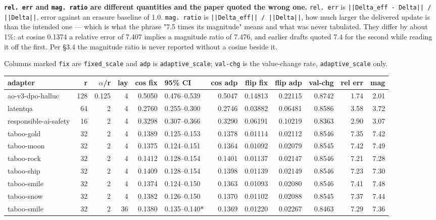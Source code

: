 \textbf{\texttt{rel. err} and \texttt{mag. ratio} are different quantities and the paper quoted the wrong one.} \texttt{rel. err} is \texttt{||Delta\_\allowbreak{}eff - Delta|| / ||Delta||}, error against an erasure baseline of 1.0. \texttt{mag. ratio} is \texttt{||Delta\_\allowbreak{}eff|| / ||Delta||}, how much larger the delivered update is than the intended one --- which is what the phrase "7.5 times its magnitude" means and what was never tabulated. They differ by about 1\%: at cosine 0.1374 a relative error of 7.407 implies a magnitude ratio of 7.476, and earlier drafts quoted 7.4 for the second while reading it off the first. Per \S{}3.4 the magnitude ratio is never reported without a cosine beside it.

Columns marked \texttt{fix} are \texttt{fixed\_\allowbreak{}scale} and \texttt{adp} is \texttt{adaptive\_\allowbreak{}scale}; \texttt{val-\allowbreak{}chg} is the value-change rate, \texttt{adaptive\_\allowbreak{}scale} only.

\begin{table}[t]
\centering\footnotesize
\begin{tabularx}{\textwidth}{>{\hsize=1.000\hsize\raggedright\arraybackslash}Xrrrrlrrrrrr}
\toprule
adapter & r & $\alpha$/r & lay & cos fix & 95\% CI & cos adp & flip fix & flip adp & val-chg & rel err & mag \\
\midrule
ao-v3-dpo-halluc & 128 & 0.125 & 4 & 0.5050 & 0.476--0.539 & 0.5047 & 0.14813 & 0.22115 & 0.8742 & 1.74 & 2.01 \\
latentqa & 64 & 2 & 4 & 0.2760 & 0.255--0.300 & 0.2746 & 0.03882 & 0.06481 & 0.8586 & 3.58 & 3.72 \\
responsible-ai-safety & 16 & 2 & 4 & 0.3298 & 0.307--0.366 & 0.3290 & 0.06191 & 0.10219 & 0.8363 & 2.90 & 3.07 \\
taboo-gold & 32 & 2 & 4 & 0.1389 & 0.125--0.153 & 0.1378 & 0.01114 & 0.02112 & 0.8546 & 7.35 & 7.42 \\
taboo-moon & 32 & 2 & 4 & 0.1375 & 0.124--0.151 & 0.1364 & 0.01092 & 0.02079 & 0.8545 & 7.42 & 7.49 \\
taboo-rock & 32 & 2 & 4 & 0.1412 & 0.128--0.154 & 0.1401 & 0.01137 & 0.02147 & 0.8546 & 7.21 & 7.28 \\
taboo-ship & 32 & 2 & 4 & 0.1409 & 0.128--0.154 & 0.1398 & 0.01139 & 0.02149 & 0.8546 & 7.23 & 7.30 \\
taboo-smile & 32 & 2 & 4 & 0.1374 & 0.124--0.150 & 0.1363 & 0.01093 & 0.02080 & 0.8546 & 7.41 & 7.48 \\
taboo-snow & 32 & 2 & 4 & 0.1382 & 0.126--0.150 & 0.1370 & 0.01102 & 0.02088 & 0.8545 & 7.37 & 7.44 \\
taboo-smile & 32 & 2 & 36 & 0.1380 & 0.135--0.140* & 0.1369 & 0.01220 & 0.02267 & 0.8463 & 7.29 & 7.36 \\
\bottomrule
\end{tabularx}
\end{table}

